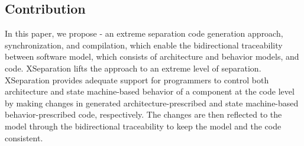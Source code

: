 \subsection{Contribution}
\label{subsec:contribution}
In this paper, we propose  - an extreme separation code generation approach, synchronization, and compilation, which enable the bidirectional traceability between software model, which consists of architecture and behavior models, and code.
XSeparation lifts the  approach to an extreme level of separation.
XSeparation provides adequate support for programmers to control both architecture and state machine-based behavior of a component at the code level by making changes in generated architecture-prescribed and state machine-based behavior-prescribed code, respectively.
The changes are then reflected to the model through the bidirectional traceability to keep the model and the code consistent. 


 
